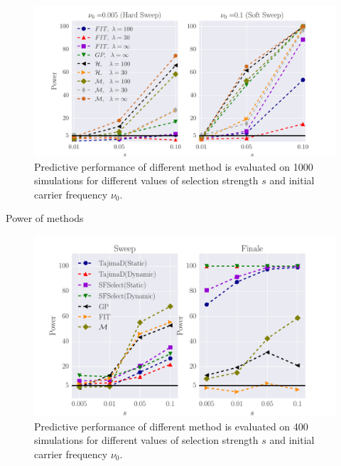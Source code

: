 \documentclass[11pt]{article}
\begin{document}
\begin{figure}[H]
	\centering
	\includegraphics[trim=.2in 0 .2in 0 , clip,width=\textwidth]{figures/power.pdf}
	\caption{Predictive performance of different method is evaluated on 1000 
		simulations for different values of selection strength $s$ and initial 
		carrier frequency $\nu_0$.} \label{fig:power}
\end{figure}
\begin{table}[h]
	
	\caption{Power of methods}
\end{table}
\newpage
\begin{figure}[H]
	\centering
	\includegraphics[trim=.2in 0 .2in 0 , clip,width=\textwidth]{figures/naturalee.pdf}
	\caption{Predictive performance of different method is evaluated on 400 
		simulations for different values of selection strength $s$ and initial 
		carrier frequency $\nu_0$.} \label{fig:powerSFS}
\end{figure}
\end{document}
